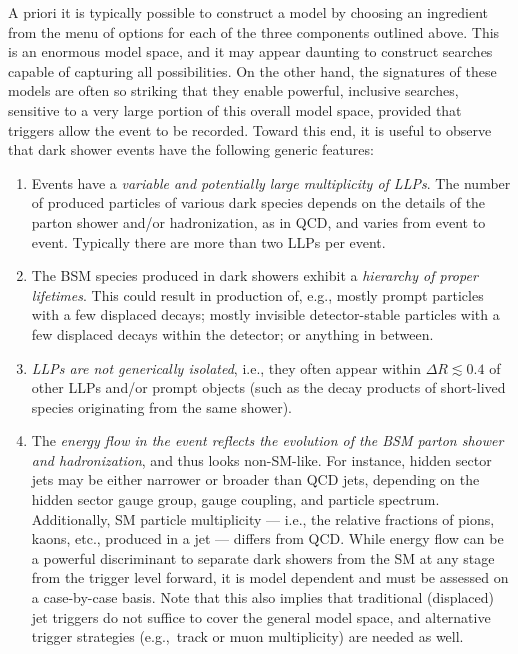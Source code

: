 A priori it is typically possible to construct a model by choosing an ingredient from the menu of options for each of the three components outlined above. This is an enormous model space, and it may appear daunting to construct searches capable of capturing all possibilities. On the other hand, the signatures of these models are often so striking that they enable powerful, inclusive searches, sensitive to a very large portion of this overall model space, provided that triggers allow the event to be recorded. Toward this end, it is useful to observe that dark shower events have the following generic features:
%
\begin {enumerate}

\item Events have a {\it variable and potentially large multiplicity of LLPs}.
The number of produced particles of various dark species depends on the details of the parton shower and/or hadronization, as in QCD, and varies from event to event. Typically there are more than two LLPs per event.

\item The BSM species produced in dark showers exhibit a {\it hierarchy of proper lifetimes}.
This could result in production of, e.g., mostly prompt particles with a few displaced decays; mostly invisible detector-stable particles with a few displaced decays within the detector; or anything in between.

\item {\it LLPs are not generically isolated}, i.e., they often appear within $\Delta R \lesssim 0.4$ of other LLPs and/or prompt objects (such as the decay products of short-lived species originating from the same shower).

\item The {\it energy flow in the event  reflects the evolution of the BSM parton shower and hadronization}, and  thus looks non-SM-like. For instance, hidden sector jets may be either narrower or broader than QCD jets, depending on the hidden sector gauge group, gauge coupling, and particle spectrum. Additionally, SM particle multiplicity --- i.e., the relative fractions of pions, kaons, etc., produced in a jet ---  differs from QCD. While energy flow can be a powerful discriminant to separate dark showers from the SM at any stage from the trigger level forward, it is model dependent and must be assessed on a case-by-case basis. Note that this also implies that traditional (displaced) jet triggers do not suffice to cover the general model space, and alternative trigger strategies (e.g.,~track or muon multiplicity) are needed as well.

\end {enumerate}

